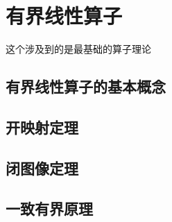 \section{\deng 有界线性算子}
这个涉及到的是最基础的算子理论

\subsection{\zhen 有界线性算子的基本概念}

\subsection{\zhen 开映射定理}


\subsection{\zhen 闭图像定理}

\subsection{\zhen 一致有界原理}

